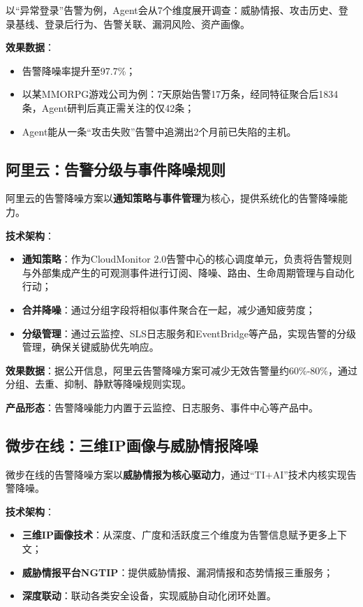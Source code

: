\documentclass[11pt,a4paper]{article}
\begin{document}
以“异常登录”告警为例，Agent会从7个维度展开调查：威胁情报、攻击历史、登录基线、登录后行为、告警关联、漏洞风险、资产画像。

\textbf{效果数据}：
\begin{itemize}
    \item 告警降噪率提升至97.7\%；
    \item 以某MMORPG游戏公司为例：7天原始告警17万条，经同特征聚合后1834条，Agent研判后真正需关注的仅42条；
    \item Agent能从一条“攻击失败”告警中追溯出2个月前已失陷的主机。
\end{itemize}

\subsection{阿里云：告警分级与事件降噪规则}

阿里云的告警降噪方案以\textbf{通知策略与事件管理}为核心，提供系统化的告警降噪能力。

\textbf{技术架构}：
\begin{itemize}
    \item \textbf{通知策略}：作为CloudMonitor 2.0告警中心的核心调度单元，负责将告警规则与外部集成产生的可观测事件进行订阅、降噪、路由、生命周期管理与自动化行动；
    \item \textbf{合并降噪}：通过分组字段将相似事件聚合在一起，减少通知疲劳度；
    \item \textbf{分级管理}：通过云监控、SLS日志服务和EventBridge等产品，实现告警的分级管理，确保关键威胁优先响应。
\end{itemize}

\textbf{效果数据}：据公开信息，阿里云告警降噪方案可减少无效告警量约60\%-80\%，通过分组、去重、抑制、静默等降噪规则实现。

\textbf{产品形态}：告警降噪能力内置于云监控、日志服务、事件中心等产品中。

\subsection{微步在线：三维IP画像与威胁情报降噪}

微步在线的告警降噪方案以\textbf{威胁情报为核心驱动力}，通过“TI+AI”技术内核实现告警降噪。

\textbf{技术架构}：
\begin{itemize}
    \item \textbf{三维IP画像技术}：从深度、广度和活跃度三个维度为告警信息赋予更多上下文；
    \item \textbf{威胁情报平台NGTIP}：提供威胁情报、漏洞情报和态势情报三重服务；
    \item \textbf{深度联动}：联动各类安全设备，实现威胁自动化闭环处置。
\end{itemize}
\end{document}
